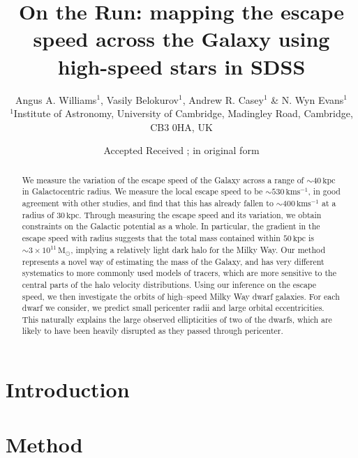 \documentclass[useAMS,twocolumn,usenatbib]{mn2e}
\title[Fast moving stars in SDSS] 
      {On the Run: mapping the escape speed across the Galaxy using high-speed stars in SDSS}
\author[Williams, Belokurov, Casey \& Evans]{Angus A. Williams$^1$, Vasily Belokurov$^1$, Andrew R. Casey$^1$ \& N. Wyn Evans$^1$
  \medskip
  \\$^1$Institute of Astronomy, University of Cambridge, Madingley Road,
       Cambridge, CB3 0HA, UK}
\def\kpc{{\,\mathrm{kpc}}}
\def\kms{{\,\mathrm{kms^{-1}}}}
\def\Msun{{\,\mathrm{M}_\odot}}
\begin{document}
\date{Accepted  Received ; in original form }

\pagerange{\pageref{firstpage}--\pageref{lastpage}} 

\maketitle

\label{firstpage}

\begin{abstract}

We measure the variation of the escape speed of the Galaxy across a range of $\sim 40\kpc$ in 
Galactocentric radius. We measure the local escape speed to be $\sim 530\kms$, in good agreement 
with other studies, and find that this has already fallen to $\sim 400\kms$ at a radius 
of $30\kpc$. Through measuring the escape speed and its variation, we obtain constraints on the 
Galactic potential as a whole. In particular, the gradient in the escape speed with radius suggests 
that the total mass contained within $50\kpc$ is $\sim 3\times10^{11}\Msun$, implying a 
relatively light dark halo for the Milky Way. Our method represents a novel way of estimating the 
mass of the Galaxy, and has very different systematics to more commonly used models of tracers, which 
are more sensitive to the central parts of the halo velocity distributions. Using our inference on 
the escape speed, we then investigate the orbits of high--speed Milky Way dwarf galaxies. For each 
dwarf we consider, we predict small pericenter radii and large orbital eccentricities. This naturally 
explains the large observed ellipticities of two of the dwarfs, which are likely to have been 
heavily disrupted as they passed through pericenter.
 
\end{abstract}

\begin{keywords}

\end{keywords}

\section{Introduction}

\section{Method}

\end{document}
